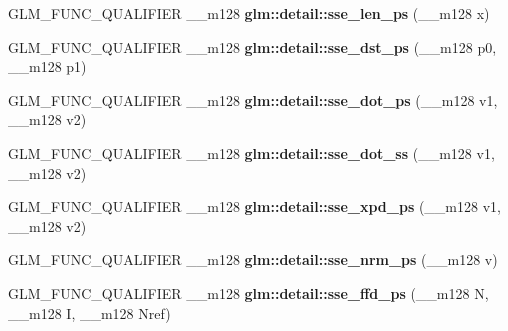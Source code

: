 \begin{DoxyCompactItemize}
\item 
\hypertarget{namespaceglm_1_1detail_aa49baf7bcbe9eb783a85bcd3ce8d8dba}{G\-L\-M\-\_\-\-F\-U\-N\-C\-\_\-\-Q\-U\-A\-L\-I\-F\-I\-E\-R \-\_\-\-\_\-m128 {\bfseries glm\-::detail\-::sse\-\_\-len\-\_\-ps} (\-\_\-\-\_\-m128 x)}\label{namespaceglm_1_1detail_aa49baf7bcbe9eb783a85bcd3ce8d8dba}

\item 
\hypertarget{namespaceglm_1_1detail_a9d4832acb69aa3f67d6e06c64b29dddd}{G\-L\-M\-\_\-\-F\-U\-N\-C\-\_\-\-Q\-U\-A\-L\-I\-F\-I\-E\-R \-\_\-\-\_\-m128 {\bfseries glm\-::detail\-::sse\-\_\-dst\-\_\-ps} (\-\_\-\-\_\-m128 p0, \-\_\-\-\_\-m128 p1)}\label{namespaceglm_1_1detail_a9d4832acb69aa3f67d6e06c64b29dddd}

\item 
\hypertarget{namespaceglm_1_1detail_ad4dfd210b559dcff4cbc4a674477b90b}{G\-L\-M\-\_\-\-F\-U\-N\-C\-\_\-\-Q\-U\-A\-L\-I\-F\-I\-E\-R \-\_\-\-\_\-m128 {\bfseries glm\-::detail\-::sse\-\_\-dot\-\_\-ps} (\-\_\-\-\_\-m128 v1, \-\_\-\-\_\-m128 v2)}\label{namespaceglm_1_1detail_ad4dfd210b559dcff4cbc4a674477b90b}

\item 
\hypertarget{namespaceglm_1_1detail_a794070b64c8a2bd03e393c79be9ed17e}{G\-L\-M\-\_\-\-F\-U\-N\-C\-\_\-\-Q\-U\-A\-L\-I\-F\-I\-E\-R \-\_\-\-\_\-m128 {\bfseries glm\-::detail\-::sse\-\_\-dot\-\_\-ss} (\-\_\-\-\_\-m128 v1, \-\_\-\-\_\-m128 v2)}\label{namespaceglm_1_1detail_a794070b64c8a2bd03e393c79be9ed17e}

\item 
\hypertarget{namespaceglm_1_1detail_a0692599f2cf8b5a9fd64ccf7023805c7}{G\-L\-M\-\_\-\-F\-U\-N\-C\-\_\-\-Q\-U\-A\-L\-I\-F\-I\-E\-R \-\_\-\-\_\-m128 {\bfseries glm\-::detail\-::sse\-\_\-xpd\-\_\-ps} (\-\_\-\-\_\-m128 v1, \-\_\-\-\_\-m128 v2)}\label{namespaceglm_1_1detail_a0692599f2cf8b5a9fd64ccf7023805c7}

\item 
\hypertarget{namespaceglm_1_1detail_a9f1826e935d79fc46faaf70499cba320}{G\-L\-M\-\_\-\-F\-U\-N\-C\-\_\-\-Q\-U\-A\-L\-I\-F\-I\-E\-R \-\_\-\-\_\-m128 {\bfseries glm\-::detail\-::sse\-\_\-nrm\-\_\-ps} (\-\_\-\-\_\-m128 v)}\label{namespaceglm_1_1detail_a9f1826e935d79fc46faaf70499cba320}

\item 
\hypertarget{namespaceglm_1_1detail_ace9256f388e836f9411a6eb92bed1a8a}{G\-L\-M\-\_\-\-F\-U\-N\-C\-\_\-\-Q\-U\-A\-L\-I\-F\-I\-E\-R \-\_\-\-\_\-m128 {\bfseries glm\-::detail\-::sse\-\_\-ffd\-\_\-ps} (\-\_\-\-\_\-m128 N, \-\_\-\-\_\-m128 I, \-\_\-\-\_\-m128 Nref)}\label{namespaceglm_1_1detail_ace9256f388e836f9411a6eb92bed1a8a}


\end{DoxyCompactItemize}
